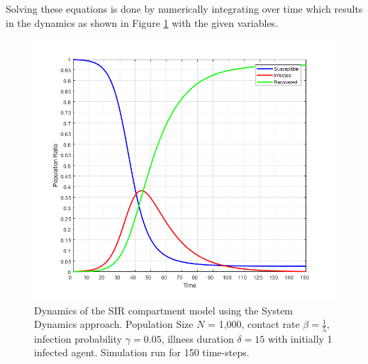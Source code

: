 Solving these equations is done by numerically integrating over time which results in the dynamics as shown in Figure \ref{fig:sir_sd_dynamics} with the given variables.

\begin{figure}
	\centering
	\includegraphics[width=.4\textwidth, angle=0]{./fig/step3_dataflow/SIR_SD_1000agents_150t_001dt.png}
	\caption{Dynamics of the SIR compartment model using the System Dynamics approach. Population Size $N$ = 1,000, contact rate $\beta =  \frac{1}{5}$, infection probability $\gamma = 0.05$, illness duration $\delta = 15$ with initially 1 infected agent. Simulation run for 150 time-steps.}
	\label{fig:sir_sd_dynamics}
\end{figure}

